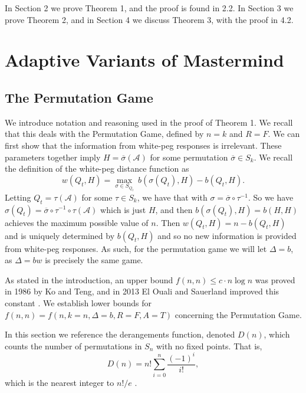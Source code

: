 \documentclass[12pt, a4paper]{article}
\newcommand{\inv}{^{-1}}              %
\begin{document}
In Section 2 we prove Theorem 1, and the proof is found in 2.2. In Section 3 we prove Theorem 2, and in Section 4 we discuss Theorem 3, with the proof in 4.2.
\section{Adaptive Variants of Mastermind}
\subsection{The Permutation Game}
We introduce notation and reasoning used in the proof of Theorem 1. We recall that this deals with the Permutation Game, defined by $n=k$ and $R=F$. We can first show that the information from white-peg responses is irrelevant. These parameters together imply $H=\overline{\sigma}(\mathcal{A})$ for some permutation $\overline{\sigma}\in S_k$. We recall the definition of the white-peg distance function as
\begin{equation*}
	w(Q_t, H) = \max_{\sigma\in S_{Q_t}}~b(\sigma(Q_t), H) - b(Q_t, H).
\end{equation*}
Letting $Q_t = \tau(\mathcal{A})$ for some $\tau \in S_k$, we have that with $\sigma = \overline{\sigma}\circ \tau\inv$. So we have $\sigma(Q_t) = \overline{\sigma}\circ\tau\inv\circ\tau(\mathcal A)$ which is just $H$, and then $b(\sigma(Q_t),H) = b(H,H)$ achieves the maximum possible value of $n$. Then $w(Q_t,H) = n - b(Q_t,H)$ and is uniquely determined by $b(Q_t,H)$ and so no new information is provided from white-peg responses. As such, for the permutation game we will let $\Delta = b$, as $\Delta = bw$ is precisely the same game.

 As stated in the introduction, an upper bound $f(n, n)\le c\cdot n\log n$ was proved in 1986 by Ko and Teng, and in 2013 El Ouali and Sauerland improved this constant \cite{KT86, OS13}. We establish lower bounds for $f(n, n) = f(n, k=n, \Delta=b, R=F, A=T)$ concerning the Permutation Game.
 
 In this section we reference the derangements function, denoted $D(n)$, which counts the number of permutations in $S_n$ with no fixed points. That is,
\begin{equation}\label{derangements}
	D(n) = n!\sum_{i=0}^n \frac{(-1)^i}{i!},
\end{equation}
which is the nearest integer to $n!/e$  \cite{MH03}.
\end{document}
